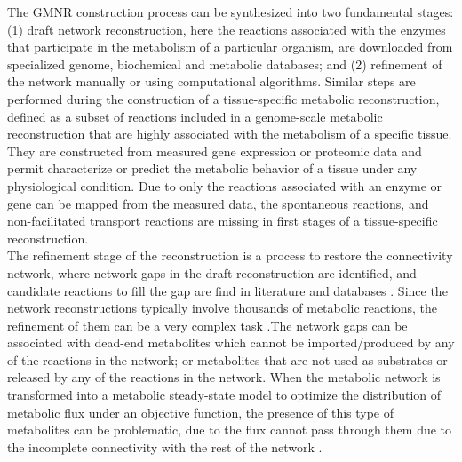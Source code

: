 The GMNR construction process can be synthesized into two fundamental stages: (1) draft network reconstruction, here the reactions associated with the enzymes that participate in the metabolism of a particular organism, are downloaded from specialized genome, biochemical and metabolic databases; and (2) refinement of the network manually or using computational algorithms. Similar steps are performed during the construction of a tissue-specific metabolic reconstruction, defined as a subset of reactions included in a genome-scale metabolic reconstruction that are highly associated with  the metabolism of a specific tissue\cite{Palsson2009}. They are constructed from measured gene expression or proteomic data and permit characterize or predict the metabolic behavior of a tissue under any physiological condition. Due to only the reactions associated with an enzyme or gene can be mapped from the measured data, the spontaneous reactions, and non-facilitated transport reactions are missing in first stages of a tissue-specific reconstruction.\\

The refinement stage of the reconstruction is a process to restore the connectivity network, where network gaps in the draft reconstruction are identified, and candidate reactions to fill the gap are find in literature and databases \cite{Thiele2010, kumar2007optimization}. Since the network reconstructions typically involve thousands of metabolic reactions, the refinement of them can be a very complex task \cite{agren2013raven}.The network gaps can be associated with dead-end metabolites which cannot be imported/produced by any of the reactions in the network; or metabolites that are not used as substrates or released by any of the reactions in the network. When the metabolic network is transformed into a metabolic steady-state model to optimize the distribution of metabolic flux under an objective function, the presence of this type of metabolites can be problematic, due to the flux cannot pass through them due to the incomplete connectivity with the rest of the network \cite{kumar2007optimization}.\\

